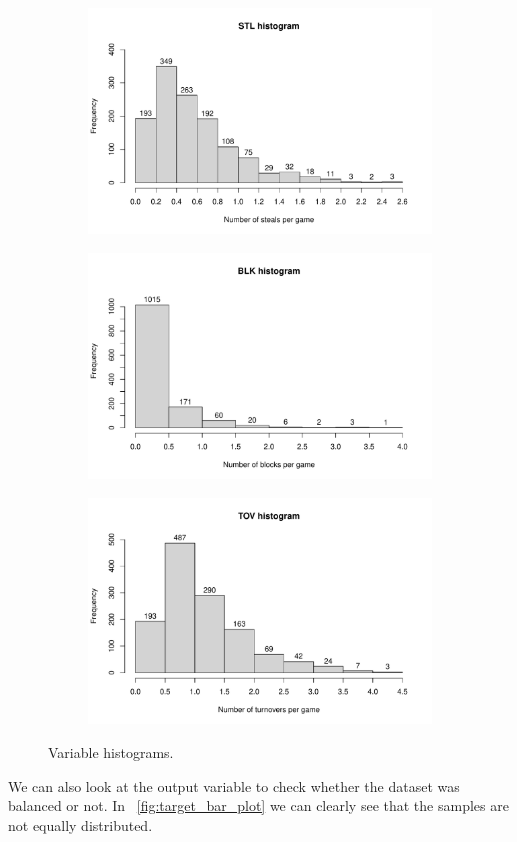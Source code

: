 \begin{figure}[H]
\begin{subfigure}{.3\textwidth}
		\caption{}
		\label{fig:HistAST}
	\end{subfigure}%
	\begin{subfigure}{.3\textwidth}
		\centering
		\includegraphics[width=0.5\linewidth]{ImageFiles/Histograms/histogram_stl}
		\caption{}
		\label{fig:HistSTL}
	\end{subfigure}%
	\begin{subfigure}{.3\textwidth}
		\centering
		\includegraphics[width=0.5\linewidth]{ImageFiles/Histograms/histogram_blk}
		\caption{}
		\label{fig:HistBLK}
	\end{subfigure}
	\begin{subfigure}{.3\textwidth}
		\centering
		\includegraphics[width=0.5\linewidth]{ImageFiles/Histograms/histogram_tov}
		\caption{}
		\label{fig:HistTOV}
	\end{subfigure}
	\caption{Variable histograms.}
	\label{fig:Histograms}
\end{figure}

We can also look at the output variable to check whether the dataset was balanced or not. In \Fig~\ref{fig:target_bar_plot} we can clearly see that the samples are not equally distributed. 

